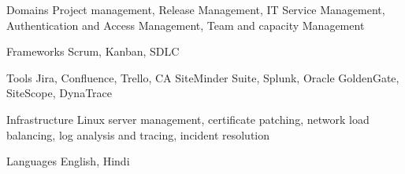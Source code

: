 

\begin{cvskills}

  \cvskill
    {Domains} %
    {Project management, Release Management, IT Service Management, Authentication and Access Management, Team and capacity Management} %

  \cvskill
    {Frameworks} %
    {Scrum, Kanban, SDLC} %

  \cvskill
    {Tools} %
    {Jira, Confluence, Trello, CA SiteMinder Suite, Splunk, Oracle GoldenGate, SiteScope, DynaTrace} %

  \cvskill
    {Infrastructure} %
    {Linux server management, certificate patching, network load balancing, log analysis and tracing, incident resolution} %

  \cvskill
    {Languages} %
    {English, Hindi} %

\end{cvskills}